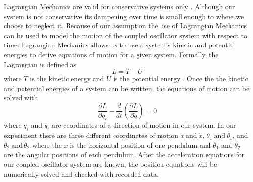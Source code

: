 \documentclass[twocolumn]{article}
\begin{document}
Lagrangian Mechanics are valid for conservative systems only \cite{WikiLagrange}. Although our system is not conservative its dampening over time is small enough to where we choose to neglect it. Because of our assumption the use of Lagrangian Mechanics can be used to model the motion of the coupled oscillator system with respect to time. Lagrangian Mechanics allows us to use a system's kinetic and potential energies to derive equations of motion for a given system. Formally, the Lagrangian is defined as
\begin{equation}\label{1}
L=T-U
\end{equation}
where $T$ is the kinetic energy and $U$ is the potential energy \cite{WikiLagrange}. Once the the kinetic and potential energies of a system can be written, the equations of motion can be solved with \cite{WikiLagrange}
\begin{equation}\label{2}
\frac{\partial L}{\partial q_{i}}-\frac{d}{dt}\left(\frac{\partial L}{\partial \dot{q}}\right)=0
\end{equation}
where $q_i$ and $\dot{q}_i$ are coordinates of a direction of motion in our system. In our experiment there are three different coordinates of motion $x \ \text{and} \ \dot{x}$, $\theta_1 \ \text{and} \ \dot{\theta_1}$, and $\theta_2 \ \text{and} \ \dot{\theta_2}$ where the $x$ is the horizontal position of one pendulum and $\theta_1$ and $\theta_2$ are the angular positions of each pendulum. After the acceleration equations for our coupled oscillator system are known, the position equations will be numerically solved and checked with recorded data.
\end{document}
